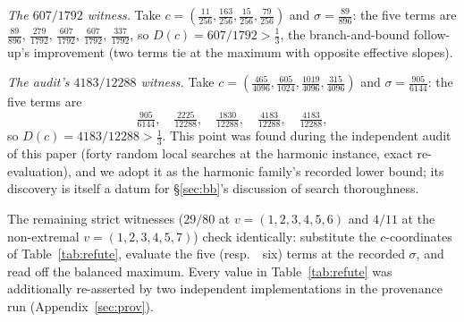 \emph{The $607/1792$ witness.} Take
$c=(\tfrac{11}{256},\tfrac{163}{256},\tfrac{15}{256},
\tfrac{79}{256})$ and $\sigma=\tfrac{89}{896}$: the five terms are
$\tfrac{89}{896}$, $\tfrac{279}{1792}$, $\tfrac{607}{1792}$,
$\tfrac{607}{1792}$, $\tfrac{337}{1792}$, so $D(c)=607/1792>
\tfrac13$, the branch-and-bound follow-up's improvement (two terms tie
at the maximum with opposite effective slopes).

\emph{The audit's $4183/12288$ witness.} Take
$c=(\tfrac{465}{4096},\tfrac{605}{1024},\tfrac{1019}{4096},
\tfrac{315}{4096})$ and $\sigma=\tfrac{905}{6144}$: the five terms are
\[
\tfrac{905}{6144},\quad \tfrac{2225}{12288},\quad
\tfrac{1830}{12288},\quad \tfrac{4183}{12288},\quad
\tfrac{4183}{12288},
\]
so $D(c)=4183/12288>\tfrac13$. This point was found during the independent audit of this
paper (forty random local searches at the harmonic instance, exact
re-evaluation), and we adopt it as the harmonic family's recorded lower
bound; its discovery is itself a datum for \S\ref{sec:bb}'s discussion
of search thoroughness.

The remaining strict witnesses ($29/80$ at $v=(1,2,3,4,5,6)$ and $4/11$
at the non-extremal $v=(1,2,3,4,5,7)$) check identically: substitute the
$c$-coordinates of Table~\ref{tab:refute}, evaluate the five (resp.\ \
six) terms at the recorded $\sigma$, and read off the balanced maximum.
Every value in Table~\ref{tab:refute} was additionally re-asserted by
two independent implementations in the provenance run
(Appendix~\ref{sec:prov}).
